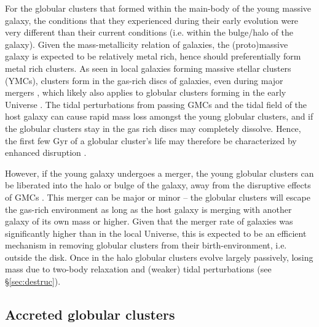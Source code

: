 \documentclass{aa}
\begin{document}
For the globular clusters that formed within the main-body of the young massive galaxy, the conditions that they experienced during their early evolution were very different than their current conditions (i.e. within the bulge/halo of the galaxy).  Given the mass-metallicity relation of galaxies, the (proto)massive galaxy is expected to be relatively metal rich, hence should preferentially form metal rich clusters.  As seen in local galaxies forming massive stellar clusters (YMCs), clusters form in the gas-rich discs of galaxies, even during major mergers \citep[e.g.][]{trancho07}, which likely also applies to globular clusters forming in the early Universe \citep[e.g.][]{kruijssen15b}.  The tidal perturbations from passing GMCs and the tidal field of the host galaxy can cause rapid mass loss amongst the young globular clusters, and if the globular clusters stay in the gas rich discs may completely dissolve.  Hence, the first few Gyr of a globular cluster's life may therefore be characterized by enhanced disruption \citep[e.g.][]{elmegreen10,kruijssen12c}.

However, if the young galaxy undergoes a merger, the young globular clusters can be liberated into the halo or bulge of the galaxy, away from the disruptive effects of GMCs \citep[e.g.][]{kruijssen12c}. This merger can be major or minor -- the globular clusters will escape the gas-rich environment as long as the host galaxy is merging with another galaxy of its own mass or higher. Given that the merger rate of galaxies was significantly higher than in the local Universe, this is expected to be an efficient mechanism in removing globular clusters from their birth-environment, i.e. outside the disk.  Once in the halo globular clusters evolve largely passively, losing mass due to two-body relaxation and (weaker) tidal perturbations (see \S\ref{sec:destruc}).

\subsection{Accreted globular clusters} \label{sec:cosmology:accreted}
\end{document}
